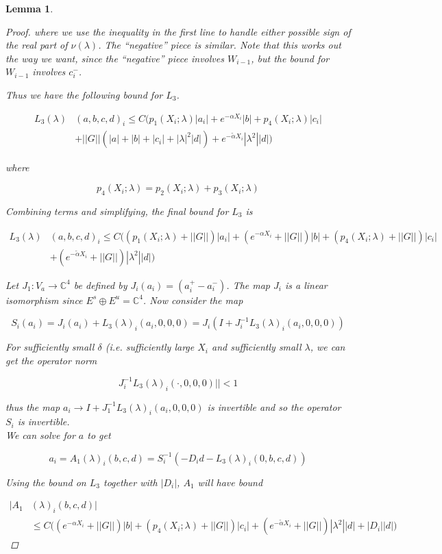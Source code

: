 \documentclass[12pt]{article}
\def\C{{\mathbb C}}
\newtheorem{lemma}{Lemma}
\begin{document}
\begin{lemma}
\begin{proof}
where we use the inequality in the first line to handle either possible sign of the real part of $\nu(\lambda)$. The ``negative'' piece is similar. Note that this works out the way we want, since the ``negative'' piece involves $W_{i-1}$, but the bound for $W_{i-1}$ involves $c_i^-$.

Thus we have the following bound for $L_3$.

\begin{align*}
L_3(\lambda)&(a, b, c, d)_i \leq C ( p_1(X_i; \lambda)|a_i|
+ e^{-\alpha X_i}|b| + p_4(X_i; \lambda)|c_i| \\
&+ ||G|| (|a| + |b| + |c_i| + |\lambda|^2|d|) + e^{-\tilde{\alpha} X_i} |\lambda^2| |d| )
\end{align*}

where

\[
p_4(X_i; \lambda) = p_2(X_i; \lambda) + p_3(X_i; \lambda)
\]

Combining terms and simplifying, the final bound for $L_3$ is

\begin{align*}
L_3(\lambda)&(a, b, c, d)_i \leq C \Big( (p_1(X_i; \lambda) + ||G|| )|a_i|
+ (e^{-\alpha X_i} + ||G||)|b| + ( p_4(X_i; \lambda) + ||G|| )|c_i| \\
&+ (e^{-\tilde{\alpha} X_i} + ||G||) |\lambda^2| |d| \Big)
\end{align*}

Let $J_1: V_a \rightarrow \C^4$ be defined by $J_i(a_i) = (a_i^+ - a_i^-)$. The map $J_i$ is a linear isomorphism since $E^s \oplus E^u = \C^4$. Now consider the map

\[
S_i(a_i) = J_i (a_i) + L_3(\lambda)_i(a_i, 0, 0, 0) = J_i( I + J_i^{-1} L_3(\lambda)_i(a_i, 0, 0, 0))
\]

For sufficiently small $\delta$ (i.e. sufficiently large $X_i$ and sufficiently small $\lambda$, we can get the operator norm 

\[
J_i^{-1} L_3(\lambda)_i(\cdot, 0, 0, 0)|| < 1
\]

thus the map $a_i \rightarrow I + J_1^{-1} L_3(\lambda)_i(a_i, 0, 0, 0)$ is invertible and so the operator $S_i$ is invertible.\\

We can solve for $a$ to get

\[
a_i = A_1(\lambda)_i(b, c, d) = S_i^{-1}(-D_i d - L_3(\lambda)_i(0, b, c, d))
\]

Using the bound on $L_3$ together with $|D_i|$, $A_1$ will have bound

\begin{align*}
|A_1&(\lambda)_i(b, c, d)| \\
&\leq C \Big( (e^{-\alpha X_i} + ||G||) |b| + ( p_4(X_i; \lambda) + ||G|| )|c_i|
+ (e^{-\tilde{\alpha} X_i} + ||G||) |\lambda^2| |d| + |D_i||d| \Big)
\end{align*} 


\end{proof}
\end{lemma}
\end{document}
